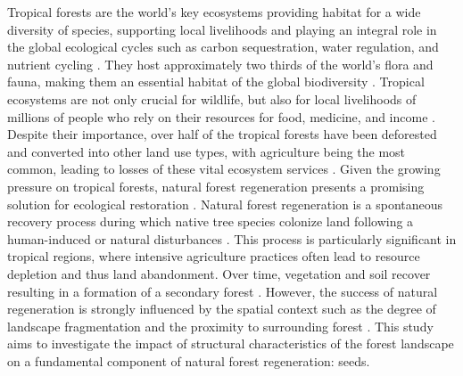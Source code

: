 Tropical forests are the world's key ecosystems providing habitat for a wide  diversity of species, supporting local livelihoods and playing an integral role in the global ecological cycles such as carbon sequestration, water regulation, and nutrient cycling \citep{bormaCarbonContributionsSouth2022}. They host approximately two thirds of the world's flora and fauna, making them an essential habitat of the global biodiversity \citep{mulatuBiodiversityMonitoringChanging2017}. Tropical ecosystems are not only crucial for wildlife, but also for local livelihoods of millions of people who rely on their resources for food, medicine, and income \citep{bormaCarbonContributionsSouth2022}. Despite their importance, over half of the tropical forests have been deforested and converted into other land use types, with agriculture being the most common, leading to losses of these vital ecosystem services \citep{chazdonNaturalRegenerationTool2016}. Given the growing pressure on tropical forests, natural forest regeneration presents a promising solution for ecological restoration \citep{hordijkLandUseHistory2024}. 
Natural forest regeneration is a spontaneous recovery process during which native tree species colonize land following a human-induced or natural disturbances \citep{crouzeillesEcologicalRestorationSuccess2017}. This process is particularly significant in tropical regions, where intensive agriculture practices often lead to resource depletion and thus land abandonment. Over time, vegetation and soil recover resulting in a formation of a secondary forest \citep{chazdonSecondGrowthPromise2014}. However, the success of natural regeneration is strongly influenced by the spatial context such as the degree of landscape fragmentation and the proximity to surrounding forest \citep{arroyo-rodriguezMultipleSuccessionalPathways2017}. This study aims to investigate the impact of structural characteristics of the forest landscape on a fundamental component of natural forest regeneration: seeds.

%

